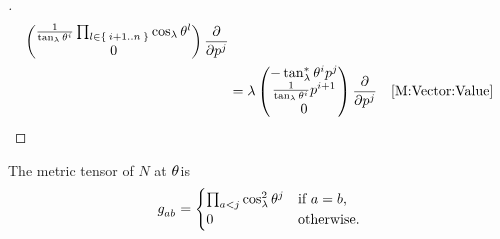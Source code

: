 \documentclass[../main.tex]{subfiles}
\begin{document}
\begin{proof}[]
\begin{align*}
\begin{pmatrix}
\frac{1}{\tan_\lambda{\tensor{\theta}{^{i}}}}\prod_{l\in\Set{i+1..n}}{\cos_\lambda{\tensor{\theta}{^l}}}\\
0\\
\end{pmatrix}
\frac{\partial}{\partial\tensor{p}{^j}}\\
&=
\lambda
\begin{pmatrix}
-\tan_\lambda^\ast\tensor{\theta}{^i}\tensor{p}{^j}\\
\frac{1}{\tan_\lambda\tensor{\theta}{^i}}\tensor{p}{^{i+1}}\\
0
\end{pmatrix}\frac{\partial}{\partial\tensor{p}{^j}}&\text{\cref{M:Vector:Value}}\qedhere\\
\end{align*}
\end{proof}
\begin{lemma}\label{M:MetricTensor}
The metric tensor of $N$ at $\tensor{\theta}{}$is
\begin{equation*}
\tensor{g}{_a_b}=
\begin{cases}
\prod_{a<j}{\cos_\lambda^2\tensor{\theta}{^j}}&\text{if $a=b$,}\\
0&\text{otherwise.}\\
\end{cases}
\end{equation*}
\end{lemma}
\end{document}
